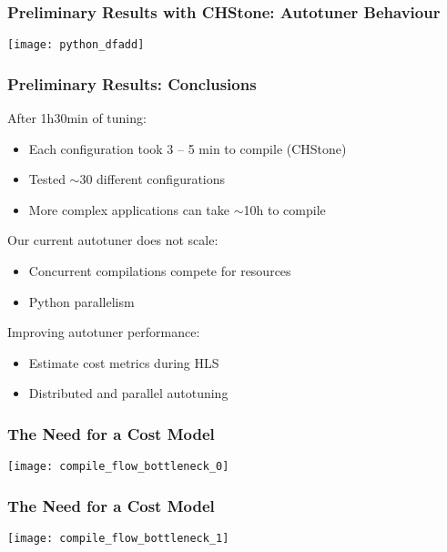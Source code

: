 \documentclass[10pt, compress, aspectratio=169]{beamer}
\begin{document}
\begin{frame}
    \frametitle{Preliminary Results with CHStone: Autotuner Behaviour}
    \begin{center}
        \texttt{[image: python\_dfadd]}
    \end{center}
\end{frame}

\begin{frame}
    \frametitle{Preliminary Results: Conclusions}
    After 1h30min of tuning:
    \begin{itemize}
        \item Each configuration took \alert{3 -- 5 min} to compile (CHStone)
        \item Tested \alert{$\sim$30 different configurations}
        \item More complex applications can take \alert{$\sim$10h} to compile
    \end{itemize}

    Our current autotuner \alert{does not scale}:
    \begin{itemize}
        \item Concurrent compilations compete for resources
        \item Python parallelism
    \end{itemize}

    Improving autotuner performance:
    \begin{itemize}
        \item \alert{Estimate cost metrics} during HLS
        \item \alert{Distributed and parallel} autotuning
    \end{itemize}
\end{frame}

\begin{frame}
    \frametitle{The Need for a Cost Model}
    \begin{center}
        \texttt{[image: compile\_flow\_bottleneck\_0]}
    \end{center}
\end{frame}

\begin{frame}
    \frametitle{The Need for a Cost Model}
    \begin{center}
        \texttt{[image: compile\_flow\_bottleneck\_1]}
    \end{center}
\end{frame}
\end{document}
